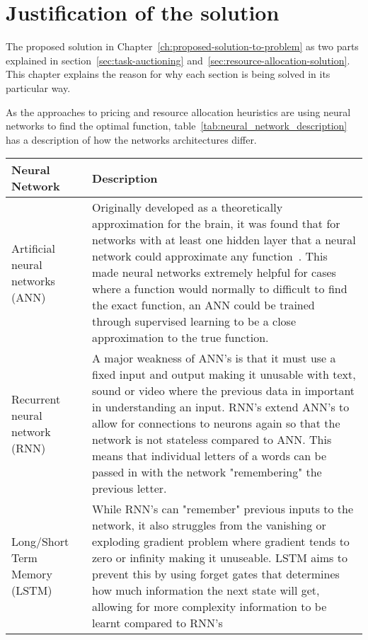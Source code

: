 \chapter{Justification of the solution}\label{ch:justification-of-the-solution}
The proposed solution in Chapter~\ref{ch:proposed-solution-to-problem} as two parts explained in
section~\ref{sec:task-auctioning} and~\ref{sec:resource-allocation-solution}. This chapter explains the reason for why each
section is being solved in its particular way.

As the approaches to pricing and resource allocation heuristics are using neural networks to find the optimal function,
table~\ref{tab:neural_network_description} has a description of how the networks architectures differ.

\begin{longtable}{|p{3.5cm}|p{11cm}|} \hline
    \textbf{Neural Network} & \textbf{Description} \\ \hline
    Artificial neural networks (ANN)~\cite{ANN} & Originally developed as a theoretically approximation for the brain,
        it was found that for networks with at least one hidden layer that a neural network could approximate any
        function~\citep{csaji2001approximation}. This made neural networks extremely helpful for cases where a function
        would normally to difficult to find the exact function, an ANN could be trained through supervised learning to
        be a close approximation to the true function. \\ \hline

    Recurrent neural network (RNN)~\cite{RNN} & A major weakness of ANN's is that it must use a fixed input and output
        making it unusable with text, sound or video where the previous data in important in understanding an input.
        RNN's extend ANN's to allow for connections to neurons again so that the network is not stateless compared to
        ANN. This means that individual letters of a words can be passed in with the network "remembering" the
        previous letter. \\ \hline

    Long/Short Term Memory (LSTM)~\cite{LSTM} & While RNN's can "remember" previous inputs to the network, it also
        struggles from the vanishing or exploding gradient problem where gradient tends to zero or infinity making it
        unuseable. LSTM aims to prevent this by using forget gates that determines how much information the next state
        will get, allowing for more complexity information to be learnt compared to RNN's\\ \hline


\end{longtable}
